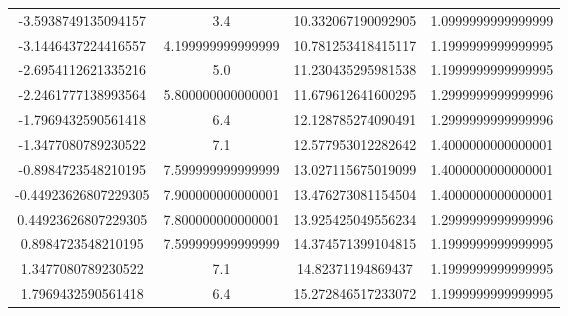 \begin{table}
\begin{tabular}{S[]S[]S[]S[]}
-3.5938749135094157 & 3.4                 & 10.332067190092905 & 1.0999999999999999\\ 
-3.1446437224416557 & 4.199999999999999   & 10.781253418415117 & 1.1999999999999995\\
-2.6954112621335216 & 5.0                 & 11.230435295981538 & 1.1999999999999995\\
-2.2461777138993564 & 5.800000000000001   & 11.679612641600295 & 1.2999999999999996\\
-1.7969432590561418 & 6.4                 & 12.128785274090491 & 1.2999999999999996\\
-1.3477080789230522 & 7.1                 & 12.577953012282642 & 1.4000000000000001\\
-0.8984723548210195 & 7.599999999999999   & 13.027115675019099 & 1.4000000000000001\\
-0.44923626807229305 & 7.900000000000001  & 13.476273081154504 & 1.4000000000000001\\
0.44923626807229305 & 7.800000000000001   & 13.925425049556234 & 1.2999999999999996\\
0.8984723548210195 & 7.599999999999999    & 14.374571399104815 & 1.1999999999999995\\
1.3477080789230522 & 7.1                  & 14.82371194869437 & 1.1999999999999995\\
1.7969432590561418 & 6.4                  & 15.272846517233072 & 1.1999999999999995\\

\bottomrule
\end{tabular}\end{table}